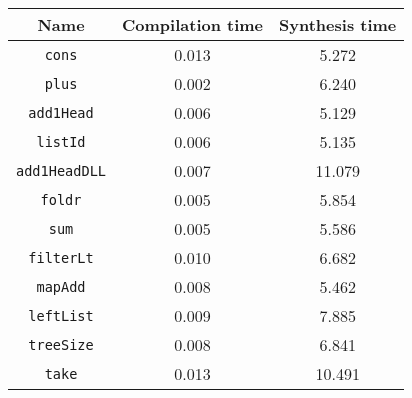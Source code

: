 \begin{tabular}{|c|c|c|}
\hline
Name & Compilation time & Synthesis time\\
\hline
\verb|cons| & 0.013 & 5.272\\
\verb|plus| & 0.002 & 6.240\\
\verb|add1Head| & 0.006 & 5.129\\
\verb|listId| & 0.006 & 5.135\\
\verb|add1HeadDLL| & 0.007 & 11.079\\
\verb|foldr| & 0.005 & 5.854\\
\verb|sum| & 0.005 & 5.586\\
\verb|filterLt| & 0.010 & 6.682\\
\verb|mapAdd| & 0.008 & 5.462\\
\verb|leftList| & 0.009 & 7.885\\
\verb|treeSize| & 0.008 & 6.841\\
\verb|take| & 0.013 & 10.491\\
\hline
\end{tabular}
